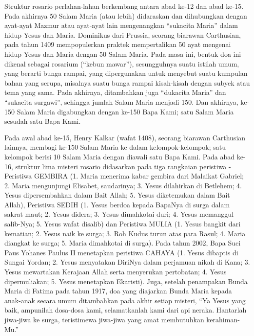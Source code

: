 Struktur rosario perlahan-lahan berkembang antara abad ke-12 dan abad ke-15. Pada akhirnya 50 Salam Maria (atau lebih) didaraskan dan dihubungkan dengan ayat-ayat Mazmur atau ayat-ayat lain mengenangkan ``sukacita Maria'' dalam hidup Yesus dan Maria. Dominikus dari Prussia, seorang biarawan Carthusian, pada tahun 1409 mempopulerkan praktek mempertalikan 50 ayat mengenai hidup Yesus dan Maria dengan 50 Salam Maria. Pada masa ini, bentuk doa ini dikenal sebagai rosarium (``kebun mawar''), sesungguhnya suatu istilah umum, yang berarti bunga rampai, yang dipergunakan untuk menyebut suatu kumpulan bahan yang serupa, misalnya suatu bunga rampai kisah-kisah dengan subyek atau tema yang sama. Pada akhirnya, ditambahkan juga ``dukacita Maria'' dan ``sukacita surgawi'', sehingga jumlah Salam Maria menjadi 150. Dan akhirnya, ke-150 Salam Maria digabungkan dengan ke-150 Bapa Kami; satu Salam Maria sesudah satu Bapa Kami.

Pada awal abad ke-15, Henry Kalkar (wafat 1408), seorang biarawan Carthusian lainnya, membagi ke-150 Salam Maria ke dalam kelompok-kelompok; satu kelompok berisi 10 Salam Maria dengan diawali satu Bapa Kami. Pada abad ke-16, struktur lima misteri rosario didasarkan pada tiga rangkaian peristiwa - Peristiwa GEMBIRA (1. Maria menerima kabar gembira dari Malaikat Gabriel; 2. Maria mengunjungi Elisabet, saudarinya; 3. Yesus dilahirkan di Betlehem; 4. Yesus dipersembahkan dalam Bait Allah; 5. Yesus diketemukan dalam Bait Allah), Peristiwa SEDIH (1. Yesus berdoa kepada BapaNya di surga dalam sakrat maut; 2. Yesus didera; 3. Yesus dimahkotai duri; 4. Yesus memanggul salib-Nya; 5. Yesus wafat disalib) dan Peristiwa MULIA (1. Yesus bangkit dari kematian; 2. Yesus naik ke surga; 3. Roh Kudus turun atas para Rasul; 4. Maria diangkat ke surga; 5. Maria dimahkotai di surga). Pada tahun 2002, Bapa Suci Paus Yohanes Paulus II menetapkan peristiwa CAHAYA (1. Yesus dibaptis di Sungai Yordan; 2. Yesus menyatakan DiriNya dalam perjamuan nikah di Kana; 3. Yesus mewartakan Kerajaan Allah serta menyerukan pertobatan; 4. Yesus dipermuliakan; 5. Yesus menetapkan Ekaristi). Juga, setelah penampakan Bunda Maria di Fatima pada tahun 1917, doa yang diajarkan Bunda Maria kepada anak-anak secara umum ditambahkan pada akhir setiap misteri, ``Ya Yesus yang baik, ampunilah dosa-dosa kami, selamatkanlah kami dari api neraka. Hantarlah jiwa-jiwa ke surga, teristimewa jiwa-jiwa yang amat membutuhkan kerahiman-Mu.''


